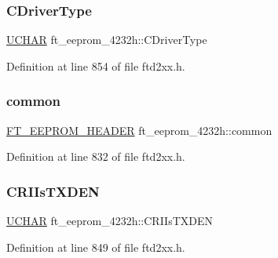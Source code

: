 \subsubsection{\texorpdfstring{C\+Driver\+Type}{CDriverType}}
{\footnotesize\ttfamily \hyperlink{CatCaloProto40MHz_2inc_2WinTypes_8h_a4f4bb67531a9bf6f0b9c6ad76aeba587}{U\+C\+H\+AR} ft\+\_\+eeprom\+\_\+4232h\+::\+C\+Driver\+Type}



Definition at line 854 of file ftd2xx.\+h.

\mbox{\label{structft__eeprom__4232h_acfee0a972954d9a20c82fcd18b082194}} 
\subsubsection{\texorpdfstring{common}{common}}
{\footnotesize\ttfamily \hyperlink{LALUsbMLx64_2include_2ftd2xx_8h_ad5a6f519cd67a403fd8742756462394e}{F\+T\+\_\+\+E\+E\+P\+R\+O\+M\+\_\+\+H\+E\+A\+D\+ER} ft\+\_\+eeprom\+\_\+4232h\+::common}



Definition at line 832 of file ftd2xx.\+h.

\mbox{\label{structft__eeprom__4232h_a7b4666be110ff5f59976c3a5f67ba13d}} 
\subsubsection{\texorpdfstring{C\+R\+I\+Is\+T\+X\+D\+EN}{CRIIsTXDEN}}
{\footnotesize\ttfamily \hyperlink{CatCaloProto40MHz_2inc_2WinTypes_8h_a4f4bb67531a9bf6f0b9c6ad76aeba587}{U\+C\+H\+AR} ft\+\_\+eeprom\+\_\+4232h\+::\+C\+R\+I\+Is\+T\+X\+D\+EN}



Definition at line 849 of file ftd2xx.\+h.

\mbox{\label{structft__eeprom__4232h_a30fb25eb86d7e47668b6a044e6196705}} 
